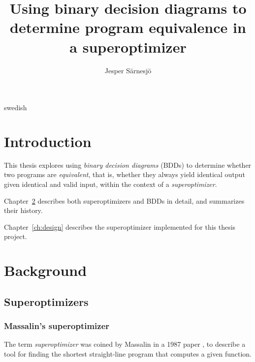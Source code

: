 \documentclass[a4paper,11pt]{kth-mag}
\title{Using binary decision diagrams to determine program equivalence in a superoptimizer}
\subtitle{}
\author{Jesper Särnesjö}
\date{}
\begin{document}
\frontmatter

\pagestyle{empty}

\removepagenumbers

\maketitle


\begin{abstract}
\end{abstract}

\clearpage

\begin{foreignabstract}{swedish}
\end{foreignabstract}

\clearpage

\tableofcontents*

\mainmatter

\pagestyle{newchap}

\chapter{Introduction}
\label{ch:introduction}

This thesis explores using \emph{binary decision diagrams} (BDDs) to determine whether two programs are \emph{equivalent}, that is, whether they always yield identical output given identical and valid input, within the context of a \emph{superoptimizer}.

Chapter~\ref{ch:background} describes both superoptimizers and BDDs in detail, and summarizes their history.

Chapter~\ref{ch:design} describes the superoptimizer implemented for this thesis project.

\chapter{Background}
\label{ch:background}

\section{Superoptimizers}

\subsection{Massalin's superoptimizer}

The term \emph{superoptimizer} was coined by Massalin in a 1987 paper \cite{massalin87}, to describe a tool for finding the shortest straight-line program that computes a given function. %
\end{document}

